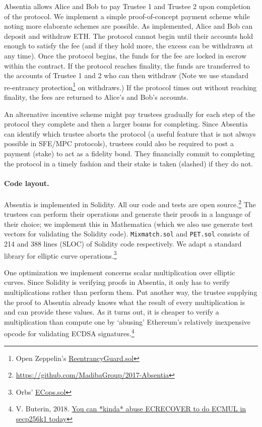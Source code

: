 Absentia allows Alice and Bob to pay Trustee 1 and Trustee 2 upon completion of the protocol. We implement a simple proof-of-concept payment scheme while noting more elaborate schemes are possible. As implemented, Alice and Bob can deposit and withdraw ETH. The protocol cannot begin until their accounts hold enough to satisfy the fee (and if they hold more, the excess can be withdrawn at any time). Once the protocol begins, the funds for the fee are locked in escrow within the contract. If the protocol reaches finality, the funds are transferred to the accounts of Trustee 1 and 2 who can then withdraw (Note we use standard re-entrancy protection\footnote{Open Zeppelin's \href{https://github.com/OpenZeppelin/openzeppelin-contracts/blob/master/contracts/utils/ReentrancyGuard.sol}{ReentrancyGuard.sol}} on withdraws.) If the protocol times out without reaching finality, the fees are returned to Alice's and Bob's accounts. 

An alternative incentive scheme might pay trustees gradually for each step of the protocol they complete and then a larger bonus for completing. Since Absentia can identify which trustee aborts the protocol (a useful feature that is not always possible in SFE/MPC protocols), trustees could also be required to post a payment (stake) to act as a fidelity bond. They financially commit to completing the protocol in a timely fashion and their stake is taken (slashed) if they do not.


\paragraph{Code layout.} 

Absentia is implemented in Solidity. All our code and tests are open source.\footnote{\url{https://github.com/MadibaGroup/2017-Absentia}} The trustees can perform their operations and generate their proofs in a language of their choice; we implement this in Mathematica (which we also use generate test vectors for validating the Solidity code). \texttt{Mixmatch.sol} and \texttt{PET.sol} consists of 214 and 388 lines (SLOC) of Solidity code respectively. We adapt a standard library for elliptic curve operations.\footnote{Orbs' \href{https://github.com/orbs-network/elliptic-curve-solidity/blob/master/ECops.sol}{ECops.sol}}

One optimization we implement concerns scalar multiplication over elliptic curves. Since Solidity is verifying proofs in Absentia, it only has to verify multiplications rather than perform them. Put another way, the trustee supplying the proof to Absentia already knows what the result of every multiplication is and can provide these values. As it turns out, it is cheaper to verify a multiplication than compute one by `abusing' Ethereum's relatively inexpensive opcode for validating ECDSA signatures.\footnote{V. Buterin, 2018. \href{https://ethresear.ch/t/you-can-kinda-abuse-ecrecover-to-do-ecmul-in-secp256k1-today/2384}{You can *kinda* abuse ECRECOVER to do ECMUL in secp256k1 today}}


